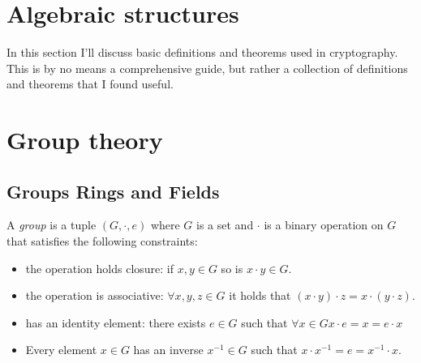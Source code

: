 
\chapter{Algebraic structures}
In this section I'll discuss basic definitions and theorems used in cryptography.
This is by no means a comprehensive guide, 
but rather a collection of definitions and theorems that I found useful.


\chapter{Group theory}

\section{Groups Rings and Fields}
\begin{defn}
    A \emph{group} is a tuple $(G,\cdot,e)$ where $G$ is a set and $\cdot$ is a binary operation on $G$
    that satisfies the following constraints:
    \begin{itemize}
        \item the operation holds closure: if $x,y\in G$ so is $x\cdot y\in G$.
        \item the operation is associative: $\forall x,y,z\in G$ it holds that $(x\cdot y)\cdot z = x\cdot (y\cdot z)$.
        \item has an identity element: there exists $e\in G$ such that $\forall x\in G x\cdot e = x = e\cdot x$
        \item Every element $x\in G$ has an inverse $x^{-1}\in G$ such that $x\cdot x^{-1} = e = x^{-1} \cdot x$.
    \end{itemize}
\end{defn}


